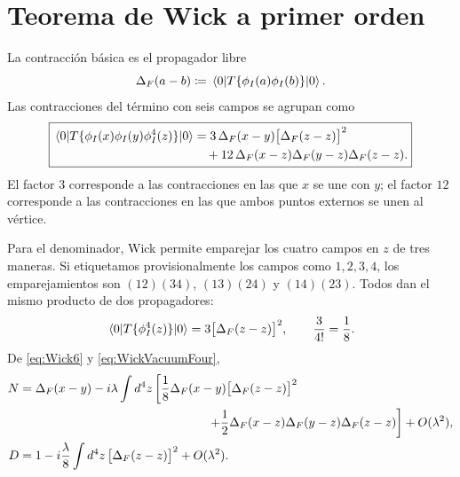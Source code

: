 \documentclass[11pt,letterpaper]{article}
\theoremstyle{definition}
\theoremstyle{definition}
\begin{document}
\section{Teorema de Wick a primer orden}

La contracción básica es el propagador libre
\begin{equation}
  \Delta_F(a-b)
  \coloneqq\mel{0}{T\{\phi_I(a)\phi_I(b)\}}{0}.
\end{equation}
Las contracciones del término con seis campos se agrupan como
\begin{equation}
  \boxed{\begin{aligned}
  \mel{0}{T\{\phi_I(x)\phi_I(y)\phi_I^4(z)\}}{0}
  &=3\,\Delta_F(x-y)\bigl[\Delta_F(z-z)\bigr]^2
  \\
  &\quad
  +12\,\Delta_F(x-z)\Delta_F(y-z)\Delta_F(z-z).
  \end{aligned}}
  \label{eq:Wick6}
\end{equation}
El factor $3$ corresponde a las contracciones en las que $x$ se une con $y$; el factor
$12$ corresponde a las contracciones en las que ambos puntos externos se unen al vértice.

Para el denominador, Wick permite emparejar los cuatro campos en $z$ de tres
maneras. Si etiquetamos provisionalmente los campos como $1,2,3,4$, los
emparejamientos son $(12)(34)$, $(13)(24)$ y $(14)(23)$. Todos dan el mismo
producto de dos propagadores:
\begin{equation}
  \mel{0}{T\{\phi_I^4(z)\}}{0}
  =3\bigl[\Delta_F(z-z)\bigr]^2,
  \qquad \frac{3}{4!}=\frac{1}{8}.
  \label{eq:WickVacuumFour}
\end{equation}
De \eqref{eq:Wick6} y \eqref{eq:WickVacuumFour},
\begin{align}
  N
  &=\Delta_F(x-y)
  -i\lambda\int d^4z\left[
    \frac{1}{8}\Delta_F(x-y)\bigl[\Delta_F(z-z)\bigr]^2
  \right.
  \notag\\
  &\hspace{5.4cm}\left.
    +\frac{1}{2}\Delta_F(x-z)\Delta_F(y-z)\Delta_F(z-z)
  \right]+O(\lambda^2),\\
  D
  &=1-i\frac{\lambda}{8}\int d^4z\,
  \bigl[\Delta_F(z-z)\bigr]^2+O(\lambda^2).
\end{align}
\end{document}
